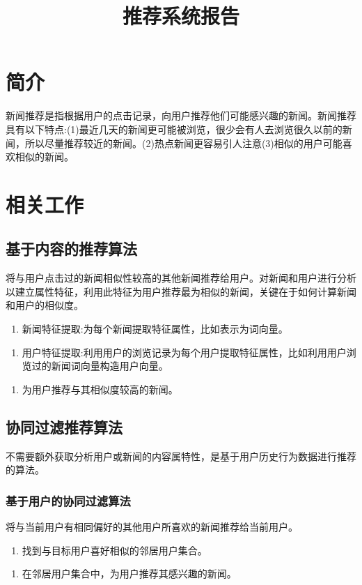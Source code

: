 \documentclass[UTF8]{article}
\begin{document}
\title{推荐系统报告}
\author{}
\date{}
\maketitle

\tableofcontents

\newpage
\section{简介}
	新闻推荐是指根据用户的点击记录，向用户推荐他们可能感兴趣的新闻。新闻推荐具有以下特点:(1)最近几天的新闻更可能被浏览，很少会有人去浏览很久以前的新闻，所以尽量推荐较近的新闻。(2)热点新闻更容易引人注意(3)相似的用户可能喜欢相似的新闻。
\section{相关工作}
\subsection{基于内容的推荐算法}
	将与用户点击过的新闻相似性较高的其他新闻推荐给用户。对新闻和用户进行分析以建立属性特征，利用此特征为用户推荐最为相似的新闻，关键在于如何计算新闻和用户的相似度。
	\begin{enumerate}{(1)}
		\item 新闻特征提取:为每个新闻提取特征属性，比如表示为词向量。
	\end{enumerate}
	\begin{enumerate}{(2)}
	\item 用户特征提取:利用用户的浏览记录为每个用户提取特征属性，比如利用用户浏览过的新闻词向量构造用户向量。
	\end{enumerate}
	\begin{enumerate}{(3)}
	\item 为用户推荐与其相似度较高的新闻。
	\end{enumerate}
\subsection{协同过滤推荐算法}
不需要额外获取分析用户或新闻的内容属特性，是基于用户历史行为数据进行推荐的算法。

\subsubsection{基于用户的协同过滤算法}
将与当前用户有相同偏好的其他用户所喜欢的新闻推荐给当前用户。
	\begin{enumerate}{(1)}
	\item 找到与目标用户喜好相似的邻居用户集合。
\end{enumerate}
\begin{enumerate}{(2)}
	\item 在邻居用户集合中，为用户推荐其感兴趣的新闻。
\end{enumerate}
\end{document}
